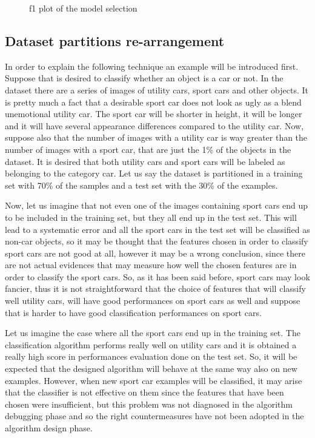 \documentclass[aps,letterpaper,10pt]{revtex4}
\begin{document}
\begin{figure}[]
  \caption{f1 plot of the model selection}\label{fig:9}
\endminipage
\end{figure}

\subsection{Dataset partitions re-arrangement}
In order to explain the following technique an example will be introduced first. Suppose that is desired to classify whether an object is a car or not. In the dataset there are a series of images of utility cars, sport cars and other objects. It is pretty much a fact that a desirable sport car does not look as ugly as a blend unemotional utility car. The sport car will be shorter in height, it will be longer and it will have several appearance differences compared to the utility car. Now, suppose also that the number of images with a utility car is way greater than the number of images with a sport car, that are just the 1\% of the objects in the dataset. It is desired that both utility cars and sport cars will be labeled as belonging to the category car. Let us say the dataset is partitioned in a training set with 70\% of the samples and a test set with the 30\% of the examples. 

Now, let us imagine that not even one of the images containing sport cars end up to be included in the training set, but they all end up in the test set. This will lead to a systematic error and all the sport cars in the test set will be classified as non-car objects, so it may be thought that the features chosen in order to classify sport cars are not good at all, however it may be a wrong conclusion, since there are not actual evidences that may measure how well the chosen features are in order to classify the sport cars. So, as it has been said before, sport cars may look fancier, thus it is not straightforward that the choice of features that will classify well utility cars, will have good performances on sport cars as well and suppose that is harder to have good classification performances on sport cars. 

Let us imagine the case where all the sport cars end up in the training set. The classification algorithm performs really well on utility cars and it is obtained a really high score in performances evaluation done on the test set. So, it will be expected that the designed algorithm will behave at the same way also on new examples. However, when new sport car examples will be classified, it may arise that the classifier is not effective on them since the features that have been chosen were insufficient, but this problem was not diagnosed in the algorithm debugging phase and so the right countermeasures have not been adopted in the algorithm design phase. 
\end{document}
